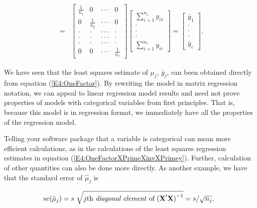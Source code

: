 \begin{center}
\begin{eqnarray}
\\
&=&%
\begin{bmatrix}
\frac{1}{n_1} & 0 & \cdot \cdot \cdot  & 0 \\
0 & \frac{1}{n_2} & \cdot \cdot \cdot  & 0 \\
\cdot  & \cdot  & \cdot \cdot \cdot  & \cdot  \\
\cdot  & \cdot  & \cdot \cdot \cdot  & \cdot  \\
\cdot  & \cdot  & \cdot \cdot \cdot  & \cdot  \\
0 & 0 & \cdot \cdot \cdot  & \frac{1}{n_c}
\end{bmatrix}
\begin{bmatrix}
\sum_{i=1}^{n_1}y_{i1} \\
\cdot  \\
\cdot  \\
\cdot  \\
\sum_{i=1}^{n_{c}}y_{ic}%
\end{bmatrix}%
=%
\begin{bmatrix}
\bar{y}_1 \\
\cdot  \\
\cdot  \\
\cdot  \\
\bar{y}_c
\end{bmatrix} .
\end{eqnarray}
\end{center}

We have seen that the least squares estimate of $\mu_j$,
$\bar{y}_j$, can been obtained directly from equation
(\ref{E4:OneFactor}). By rewriting the model in matrix regression
notation, we can appeal to linear regression model results and need
not prove properties of models with categorical variables from first
principles. That is, because this model is in regression format, we
immediately have all the properties of the regression model.

Telling your software package that a variable is categorical can
mean more efficient calculations, as in the calculations of the
least squares regression estimates in equation
(\ref{E4:OneFactorXPrimeXinvXPrimey}). Further, calculation of other
quantities can also be done more directly. As another example, we
have that the standard error of $\hat{\mu}_j$ is

\begin{equation*}
se(\hat{\mu}_j) = s ~ \sqrt{j\text{th \textit{diagonal element} of }
\mathbf{(X}^{\prime}\mathbf{X)}^{-1}} = s/\sqrt{n_j}.
\end{equation*}

